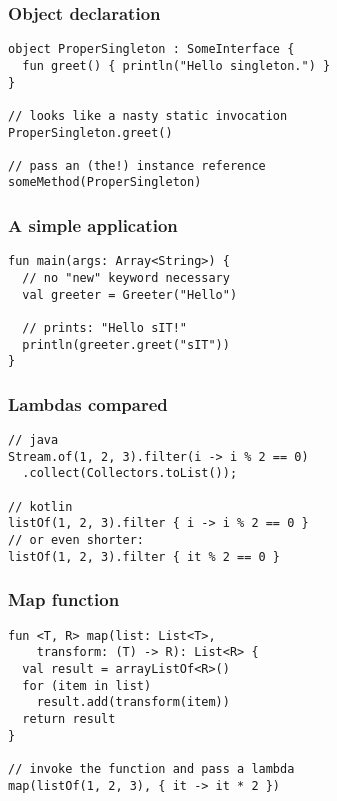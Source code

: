 \begin{frame}[fragile] \frametitle{Object declaration}
\begin{lstlisting}
object ProperSingleton : SomeInterface {
  fun greet() { println("Hello singleton.") }
}

// looks like a nasty static invocation
ProperSingleton.greet()

// pass an (the!) instance reference
someMethod(ProperSingleton)
\end{lstlisting}
\end{frame}


\begin{frame}[fragile] \frametitle{A simple application}
\begin{lstlisting}
fun main(args: Array<String>) {
  // no "new" keyword necessary
  val greeter = Greeter("Hello")

  // prints: "Hello sIT!"
  println(greeter.greet("sIT"))
}
\end{lstlisting}
\end{frame}

\begin{frame}[fragile] \frametitle{Lambdas compared}
\begin{lstlisting}
// java
Stream.of(1, 2, 3).filter(i -> i % 2 == 0)
  .collect(Collectors.toList());

// kotlin
listOf(1, 2, 3).filter { i -> i % 2 == 0 }
// or even shorter:
listOf(1, 2, 3).filter { it % 2 == 0 }
\end{lstlisting}
\end{frame}

\begin{frame}[fragile] \frametitle{Map function}
\begin{lstlisting}
fun <T, R> map(list: List<T>,
    transform: (T) -> R): List<R> {
  val result = arrayListOf<R>()
  for (item in list)
    result.add(transform(item))
  return result
}

// invoke the function and pass a lambda
map(listOf(1, 2, 3), { it -> it * 2 })
\end{lstlisting}
\end{frame}


